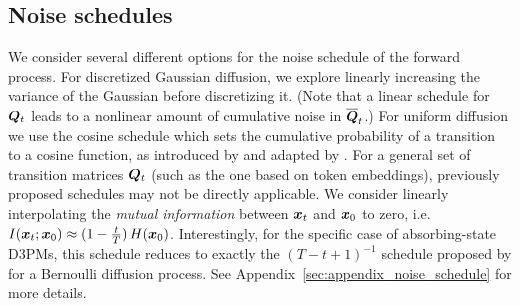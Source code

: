 \subsection{Noise schedules}
We consider several different options for the noise schedule of the forward process. For discretized Gaussian diffusion, we explore linearly increasing the variance of the Gaussian before discretizing it. (Note that a linear schedule for $\boldsymbol{Q}_t$ leads to a nonlinear amount of cumulative noise in $\overline{\boldsymbol{Q}}_t$.)
For uniform diffusion we use the cosine schedule which sets the cumulative probability of a transition to a cosine function, as introduced by \citet{nichol2021improved} and adapted by \citet{hoogeboom2021argmax}.
%
For a general set of transition matrices $\boldsymbol{Q}_t$ (such as the one based on token embeddings), previously proposed schedules may not be directly applicable. We consider linearly interpolating the \textit{mutual information} between $\boldsymbol{x}_t$ and $\boldsymbol{x}_0$ to zero, i.e. $I(\boldsymbol{x}_t; \boldsymbol{x}_0) \approx (1 - \frac{t}{T})\,H(\boldsymbol{x}_0)$. Interestingly, for the specific case of absorbing-state D3PMs, this schedule reduces to exactly the $(T-t+1)^{-1}$ schedule proposed by \citet{sohl2015deep} for a Bernoulli diffusion process. See Appendix~\ref{sec:appendix_noise_schedule} for more details.

